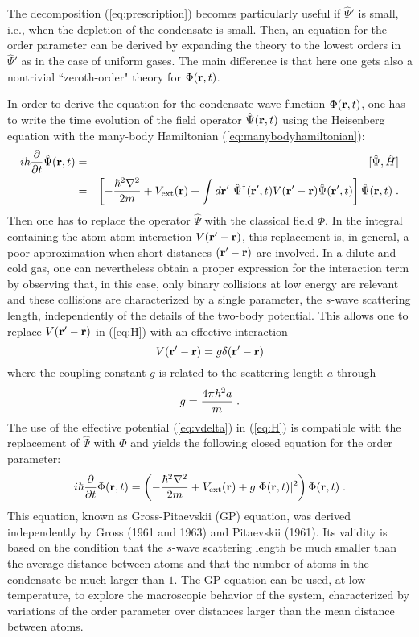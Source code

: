 The decomposition (\ref{eq:prescription}) becomes particularly useful
if $\hat\Psi'$ is small, i.e., when the depletion of the condensate
is small. Then, an equation for the order parameter
can be derived  by expanding the theory to  the lowest orders in
$\hat\Psi'$ as in the case of uniform gases. The main difference 
is that here one gets also a nontrivial ``zeroth-order" theory for
$\Phi({\bf r},t)$. 

In order to derive the equation for the condensate wave function
$\Phi({\bf r},t)$, one has to write the time evolution of the field
operator $\hat \Psi({\bf r},t)$ using the Heisenberg equation with
the many-body Hamiltonian (\ref{eq:manybodyhamiltonian}):
\begin{eqnarray}
 i\hbar \frac{\partial}{\partial t} \hat \Psi({\bf r},t)&=&
 [ \hat \Psi, \hat H ]
\nonumber \\
&=& \left[ -\frac{\hbar^2\nabla ^2}{2m} +
V_{\rm ext}({\bf r})  +\int d{\bf r}' \
\hat \Psi ^{\dagger}({\bf r}',t) V({\bf r}'-{\bf r})
\hat \Psi ({\bf r}',t) \right] \hat \Psi ({\bf r},t) \; .
\label{eq:H}
\end{eqnarray}
Then one has to replace the operator $\hat\Psi$ with the classical
field $\Phi$. In the integral containing the atom-atom interaction
$V({\bf r}'-{\bf r})$, this replacement is, in general, a poor 
approximation when short distances $({\bf r}'-{\bf r})$ are involved. 
In a dilute and cold gas, one can nevertheless obtain a proper
expression for the interaction term by observing that, in this
case, only binary collisions at low energy are relevant and these 
collisions are characterized by a single parameter, the $s$-wave 
scattering length, independently of the details of the two-body 
potential. This allows one to replace $V({\bf r}'-{\bf r})$ in 
(\ref{eq:H}) with an effective interaction 
\begin{equation}
V({\bf r}'-{\bf r}) = g \delta ({\bf r}'-{\bf r})
\label{eq:vdelta}
\end{equation}
where the coupling constant $g$ is related to the scattering
length $a$ through
\begin{equation}
g = { 4 \pi \hbar^2 a \over m} \; .
\label{eq:g}
\end{equation}
The use of the effective potential (\ref{eq:vdelta}) in 
(\ref{eq:H}) is compatible with the replacement of $\hat\Psi$ with 
$\Phi$ and yields the following closed equation for the order
parameter: 
\begin{equation}
i \hbar { \partial \over \partial t} \Phi ({\bf r},t) =
 \left( - { \hbar^2 \nabla^2 \over 2m } + V_{\rm ext}({\bf r})
+g |\Phi({\bf r},t)|^2 \right) \Phi ({\bf r},t) \; . 
\label{eq:TDGP}
\end{equation}
This equation, known as Gross-Pitaevskii (GP) equation, was
derived independently by Gross (1961 and 1963) and  Pitaevskii (1961).
Its validity is based on the condition that the $s$-wave scattering
length be much smaller than the average distance between atoms and
that the number of atoms in the condensate be much larger than $1$.
The GP equation can be used, at low temperature, to explore the
macroscopic behavior of the system, characterized by variations of the
order parameter over distances larger than the mean distance between
atoms.


